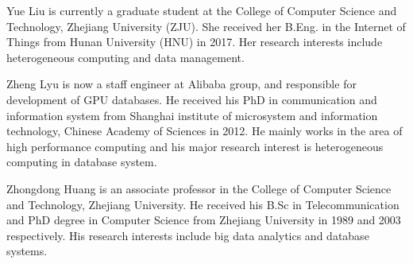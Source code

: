 \documentclass[10pt,journal,compsoc]{IEEEtran}
\begin{document}
\begin{IEEEbiography}
	{Yue Liu} is currently a graduate student at the College of Computer Science and Technology, Zhejiang University (ZJU). She received her B.Eng. in the Internet of Things from Hunan University (HNU) in 2017. Her research interests include heterogeneous computing and data management.
\end{IEEEbiography}

\begin{IEEEbiography}
	{Zheng Lyu} is now a staff engineer at Alibaba group, and responsible for development of GPU databases. He received his PhD in communication and information system from Shanghai institute of microsystem and information technology, Chinese Academy of Sciences in 2012. He mainly works in the area of high performance computing and his major research interest is heterogeneous computing in database system.
\end{IEEEbiography}

\begin{IEEEbiography}
	{Zhongdong Huang} is an associate professor in the College of Computer Science and Technology, Zhejiang University. He received his B.Sc in Telecommunication and PhD degree in Computer Science from Zhejiang University in 1989 and 2003 respectively. His research interests include big data analytics and database systems.
\end{IEEEbiography}
\end{document}
